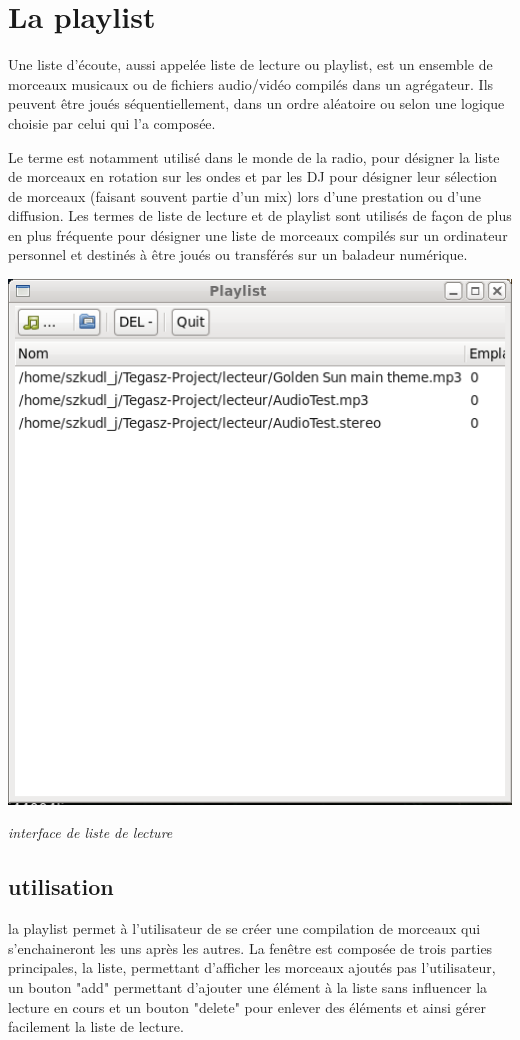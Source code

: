 \documentclass[12pt,a4paper]{report}
\begin{document}
\chapter{La playlist}

Une liste d'écoute, aussi appelée liste de lecture ou playlist, est un ensemble de morceaux musicaux ou de fichiers audio/vidéo compilés dans un agrégateur. Ils peuvent être joués séquentiellement, dans un ordre aléatoire ou selon une logique choisie par celui qui l'a composée.

Le terme est notamment utilisé dans le monde de la radio, pour désigner la liste de morceaux en rotation sur les ondes et par les DJ pour désigner leur sélection de morceaux (faisant souvent partie d'un mix) lors d'une prestation ou d'une diffusion.
Les termes de liste de lecture et de playlist sont utilisés de façon de plus en plus fréquente pour désigner une liste de morceaux compilés sur un ordinateur personnel et destinés à être joués ou transférés sur un baladeur numérique.


\begin{center}
\includegraphics[scale=0.5]{playlist.png}

\it{interface de liste de lecture}
\end{center}

\section{utilisation}
la playlist permet à l'utilisateur de se créer une compilation de morceaux qui s'enchaineront les uns après les autres. La fenêtre est composée de trois parties principales, la liste, permettant d'afficher les morceaux ajoutés pas l'utilisateur, un bouton "add" permettant d'ajouter une élément à la liste sans influencer la lecture en cours et un bouton "delete" pour enlever des éléments et ainsi gérer facilement la liste de lecture.
\end{document}
